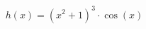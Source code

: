 \documentclass[preview]{standalone}
\begin{document}
\begin{align*}
h(x) = (x^2 + 1)^3 \cdot \cos(x)
\end{align*}
\end{document}
